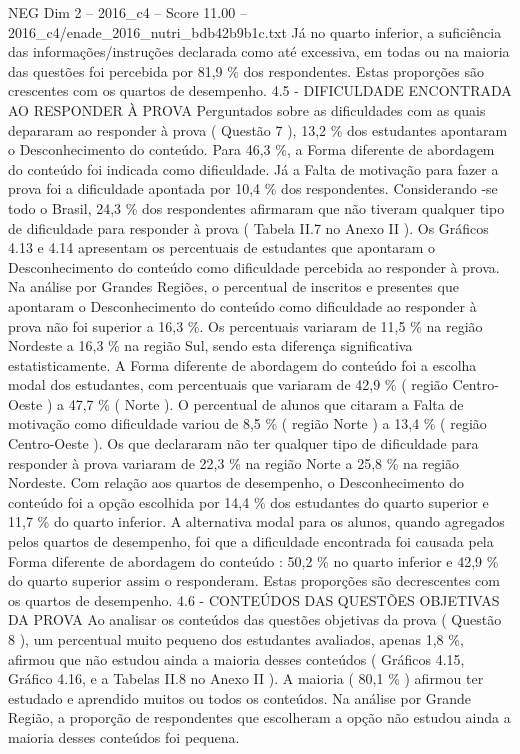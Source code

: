 \begin{textsample}{NEG Dim 2 – 2016\_c4 – Score 11.00 – 2016\_c4/enade\_2016\_nutri\_bdb42b9b1c.txt}
Já no quarto inferior, a suficiência das informações/instruções declarada como até excessiva, em todas ou na maioria das questões foi percebida por 81,9 \% dos respondentes.
Estas proporções são crescentes com os quartos de desempenho. 4.5 - DIFICULDADE ENCONTRADA AO RESPONDER À PROVA Perguntados sobre as dificuldades com as quais depararam ao responder à prova ( Questão 7 ), 13,2 \% dos estudantes apontaram o Desconhecimento do conteúdo.
Para 46,3 \%, a Forma diferente de abordagem do conteúdo foi indicada como dificuldade.
Já a Falta de motivação para fazer a prova foi a dificuldade apontada por 10,4 \% dos respondentes.
Considerando -se todo o Brasil, 24,3 \% dos respondentes afirmaram que não tiveram qualquer tipo de dificuldade para responder à prova ( Tabela II.7 no Anexo II ).
Os Gráficos 4.13 e 4.14 apresentam os percentuais de estudantes que apontaram o Desconhecimento do conteúdo como dificuldade percebida ao responder à prova.
Na análise por Grandes Regiões, o percentual de inscritos e presentes que apontaram o Desconhecimento do conteúdo como dificuldade ao responder à prova não foi superior a 16,3 \%.
Os percentuais variaram de 11,5 \% na região Nordeste a 16,3 \% na região Sul, sendo esta diferença significativa estatisticamente.
A Forma diferente de abordagem do conteúdo foi a escolha modal dos estudantes, com percentuais que variaram de 42,9 \% ( região Centro-Oeste ) a 47,7 \% ( Norte ).
O percentual de alunos que citaram a Falta de motivação como dificuldade variou de 8,5 \% ( região Norte ) a 13,4 \% ( região Centro-Oeste ).
Os que declararam não ter qualquer tipo de dificuldade para responder à prova variaram de 22,3 \% na região Norte a 25,8 \% na região Nordeste.
Com relação aos quartos de desempenho, o Desconhecimento do conteúdo foi a opção escolhida por 14,4 \% dos estudantes do quarto superior e 11,7 \% do quarto inferior.
A alternativa modal para os alunos, quando agregados pelos quartos de desempenho, foi que a dificuldade encontrada foi causada pela Forma diferente de abordagem do conteúdo : 50,2 \% no quarto inferior e 42,9 \% do quarto superior assim o responderam.
Estas proporções são decrescentes com os quartos de desempenho. 4.6 - CONTEÚDOS DAS QUESTÕES OBJETIVAS DA PROVA Ao analisar os conteúdos das questões objetivas da prova ( Questão 8 ), um percentual muito pequeno dos estudantes avaliados, apenas 1,8 \%, afirmou que não estudou ainda a maioria desses conteúdos ( Gráficos 4.15, Gráfico 4.16, e a Tabelas II.8 no Anexo II ).
A maioria ( 80,1 \% ) afirmou ter estudado e aprendido muitos ou todos os conteúdos.
Na análise por Grande Região, a proporção de respondentes que escolheram a opção não estudou ainda a maioria desses conteúdos foi pequena.

\end{textsample}
